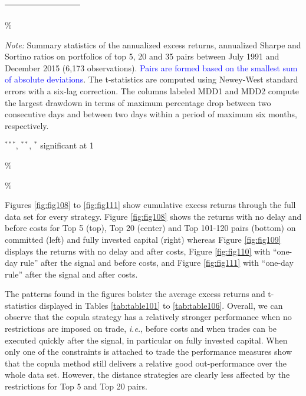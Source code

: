 \documentclass[a4paper]{article}
\begin{document}
\begin{threeparttable}[H]
\begin{tabularx}{\textwidth}{@{\extracolsep{\fill}}llllllll@{}}
			\multicolumn{1}{r}{} & \multicolumn{1}{r}{} & \multicolumn{1}{r}{} & \multicolumn{1}{r}{} & \multicolumn{1}{r}{} & \multicolumn{1}{r}{} & \multicolumn{1}{r}{} & \multicolumn{1}{r}{} \\
			\bottomrule
		\end{tabularx}\%
		\begin{tablenotes}
			\item \textit{Note:} \tiny Summary statistics of the annualized excess returns, annualized Sharpe and Sortino ratios on portfolios of top 5, 20 and 35 pairs between July 1991 and December 2015 (6,173 observations). \textcolor{blue}{Pairs are formed based on the smallest sum of absolute deviations}. The t-statistics are computed using Newey-West standard errors with a six-lag correction. The columns labeled MDD1 and MDD2 compute the largest drawdown in terms of maximum percentage drop between two consecutive days and between two days within a period of maximum six months, respectively.
			\item \scriptsize $^{\ast\ast\ast}$, $^{\ast\ast}$, $^{\ast}$  significant at 1\\%
		\end{tablenotes}
		\label{tab:table104}\%
	\end{threeparttable}\%
	
	\vspace{0.6cm}
	
	Figures \ref{fig:fig108} to \ref{fig:fig111} show cumulative excess returns through the full data set for every strategy. Figure \ref{fig:fig108} shows the returns with no delay and before costs for Top 5 (top), Top 20 (center) and Top 101-120 pairs (bottom) on committed (left) and fully invested capital (right) whereas Figure \ref{fig:fig109} displays the returns with no delay and after costs, Figure \ref{fig:fig110} with ``one-day rule'' after the signal and before costs, and Figure \ref{fig:fig111} with ``one-day rule'' after the signal and after costs.
	
	The patterns found in the figures bolster the average excess returns and t-statistics displayed in Tables \ref{tab:table101} to \ref{tab:table106}. Overall, we can observe that the copula strategy has a relatively stronger performance when no restrictions are imposed on trade, \emph{i.e.}, before costs and when trades can be executed quickly after the signal, in particular on fully invested capital. When only one of the constraints is attached to trade the performance measures show that the copula method still delivers a relative good out-performance over the whole data set. However, the distance strategies are clearly less affected by the restrictions for Top 5 and Top 20 pairs.
	
\end{document}
